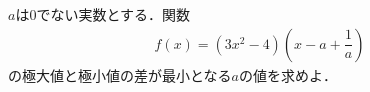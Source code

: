 \documentclass[../../main.tex]{subfiles}
\begin{document}
$a$は0でない実数とする．関数
\begin{align*}
  f(x)=(3x^2-4) \left( x-a+\dfrac{1}{a} \right)
\end{align*}
の極大値と極小値の差が最小となる$a$の値を求めよ．
\end{document}
